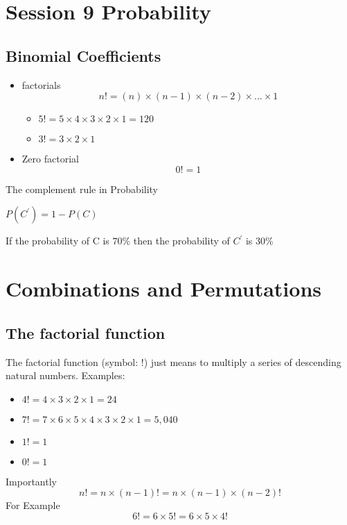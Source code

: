 \documentclass[a4paper,12pt]{article}
\begin{document}

\section*{Session 9 Probability}
\subsection*{Binomial Coefficients}
\begin{itemize}
\item factorials 
\[ n! = (n)\times (n-1)\times(n-2) \times \ldots \times 1 \]
\begin{itemize}
\item $5! = 5 \times 4 \times 3 \times 2 \times 1 = 120 $
\item $3! = 3 \times 2 \times 1$
\end{itemize}
\item Zero factorial
\[ 0! =  1 \]
\end{itemize}


The complement rule in Probability

$P(C^{\prime}) = 1- P(C)$

 

If the probability of C is $70 \%$ then the probability of $C^{\prime}$ is $30\%$

\section*{Combinations and Permutations }
\subsection*{The factorial function}
The factorial function (symbol: !) just means to multiply a series of descending natural numbers. Examples:

\begin{itemize}
\item $4! = 4 \times 3 \times 2 \times 1 = 24$
\item $7! = 7 \times 6 \times 5 \times 4 \times 3 \times 2 \times 1 = 5,040$
\item $1! = 1$
\item $0! = 1 $
\end{itemize}
Importantly 
\[n! = n \times (n-1)!  = n \times (n-1) \times (n-2)! \]
For Example
\[6! = 6 \times 5!  = 6 \times 5 \times 4! \]
\end{document}
